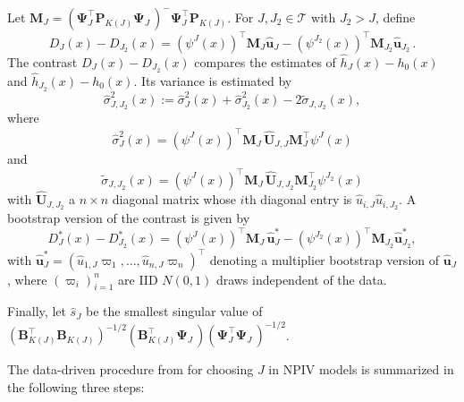 \documentclass[
]{jss}
\begin{document}
Let
\(\mathbf M_J = (\mathbf \Psi_J^\top \mathbf P_{K(J)}^{\phantom \top} \mathbf \Psi_J^{\phantom \top} )^{-} \mathbf \Psi_J^\top \mathbf P_{K(J)}^{\phantom \top}\).
For \(J,J_2 \in \mathcal T\) with \(J_2 > J\), define \[
D_{J}(x)-D_{J_2}(x) = (\psi^J(x))^\top \mathbf M_J \hat{\mathbf  u}_J - (\psi^{J_2}(x))^\top \mathbf M_{J_2} \hat{\mathbf u}_{J_2} \,.
\] The contrast \(D_{J}(x)-D_{J_2}(x)\) compares the estimates of
\(\hat h_J(x) - h_0(x)\) and \(\hat h_{J_2}(x) - h_0(x)\). Its variance
is estimated by \[
 \hat \sigma_{J,J_2}^2(x) := \hat \sigma_{J}^2(x) + \hat \sigma_{J_2}^2(x) - 2 \tilde \sigma_{J,J_2}(x),
\] where \[
 \hat \sigma_{J}^2(x) =  (\psi^J(x))^\top \mathbf M_J^{\phantom \top} \widehat{\mathbf U}_{J,J}^{\phantom \top} \mathbf M_J^\top \psi^J(x)
\] and \[
 \tilde \sigma_{J,J_2}(x)  = (\psi^J(x))^\top \mathbf M_J^{\phantom \top} \widehat{\mathbf U}_{J,J_2}^{\phantom \top} \mathbf M_{J_2}^\top \psi^{J_2}(x)
\] with \(\widehat{\mathbf U}_{J,J_2}\) a \(n\times n\) diagonal matrix
whose \(i\)th diagonal entry is \(\hat u_{i,J} \hat u_{i,J_2}\). A
bootstrap version of the contrast is given by \[
D_{J}^*(x)-D_{J_2}^*(x) = (\psi^J(x))^\top\mathbf M_J^{\phantom \top}  \hat{\mathbf u}_J^* - (\psi^{J_2}(x))^\top \mathbf M_{J_2}^{\phantom \top} \hat{\mathbf u}_{J_2}^*,
\] with
\(\hat{\mathbf u}_J^* = (\hat u_{1,J}\varpi_1,\ldots,\hat u_{n,J}\varpi_n)^\top\)
denoting a multiplier bootstrap version of \(\hat{\mathbf u}_J\), where
\((\varpi_i)_{i=1}^n\) are IID \(N(0,1)\) draws independent of the data.

Finally, let \(\hat s_J\) be the smallest singular value of
\((\mathbf B_{K(J)}^\top\mathbf B_{K(J)}^{\phantom \top})^{-1/2} (\mathbf B_{K(J)}^\top \mathbf \Psi_J^{\phantom \top}) (\mathbf \Psi_J^\top \mathbf \Psi_J^{\phantom \top})^{-1/2}\).

The data-driven procedure from \citet{CCK} for choosing \(J\) in NPIV
models is summarized in the following three steps:
\end{document}
